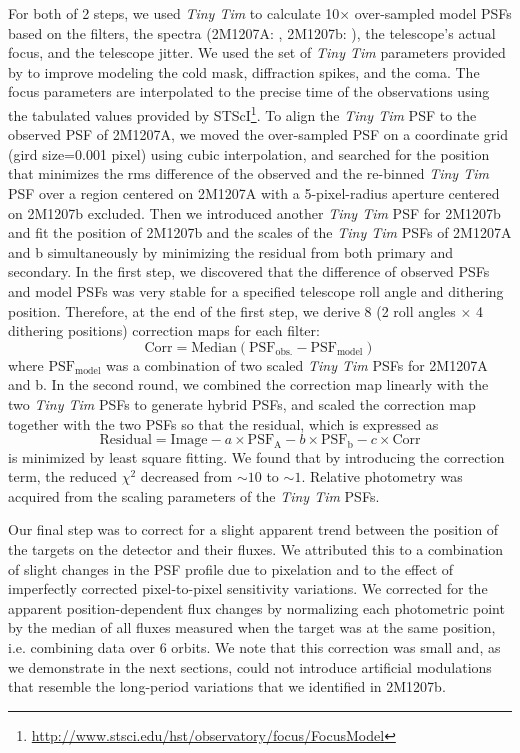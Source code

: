\documentclass[apj]{emulateapj}
\newcommand{\tinytim}{\textit{Tiny Tim}}
\begin{document}
For both of 2 steps, we used \tinytim{} to calculate 10$\times$
over-sampled model PSFs based on the filters, the spectra (2M1207A:
\cite{Bonnefoy2014}, 2M1207b: \cite{Patience2010}), the telescope's
actual focus, and the telescope jitter.  We used the set of \tinytim{}
parameters provided by \cite{Biretta2014} to improve modeling the cold
mask, diffraction spikes, and the coma. The focus parameters are 
interpolated to the precise time of the observations using the
tabulated values provided by
STScI\footnote{\url{http://www.stsci.edu/hst/observatory/focus/FocusModel}}.
To align the \tinytim{} PSF to the observed PSF of 2M1207A, we
moved the over-sampled PSF on a coordinate grid (gird size=0.001 pixel)
using cubic interpolation, and searched for the position that minimizes
the rms difference of the observed and the re-binned \tinytim{} PSF over
a region centered on 2M1207A with a 5-pixel-radius aperture centered
on 2M1207b excluded.  Then we introduced another \tinytim{} PSF for
2M1207b and fit the position of 2M1207b and the scales of the
\tinytim{} PSFs of 2M1207A and b simultaneously by minimizing the
residual from both primary and secondary. In the first step, we discovered that the
difference of observed PSFs and model PSFs was very stable for a
specified telescope roll angle and dithering position. Therefore, at the end of the first step,
we derive 8 (2 roll angles $\times$ 4 dithering positions) correction
maps for each filter:
\begin{equation}
  \mathrm{Corr = Median(PSF_{obs.} - PSF_{model} )}
\end{equation}
where $\mathrm{PSF_{model}}$ was a combination of two scaled \tinytim{} PSFs
for 2M1207A and b. In the second round, we combined the correction
map linearly with the two \tinytim{} PSFs to generate hybrid PSFs,
and scaled the correction map together with the two PSFs so that the
residual, which is expressed as
\begin{equation}
  \mathrm{Residual} = \mathrm{Image} - a\times \mathrm{PSF_{A}} - b\times
    \mathrm{PSF_{b}}- c\times\mathrm{ Corr}
  \end{equation}
  is minimized by least square fitting.
We found that by introducing the correction term,
the reduced $\chi^{2}$ decreased from $\sim 10$ to
$\sim 1$. Relative photometry was acquired from the scaling
parameters of the \tinytim{} PSFs.


Our final step was to correct for a slight apparent trend between the
position of the targets on the detector and their fluxes. We attributed
this to a combination of slight changes in the PSF profile due to
pixelation and to the effect of imperfectly corrected pixel-to-pixel
sensitivity variations. We corrected for the apparent
position-dependent flux changes by normalizing each photometric point
by the median of all fluxes measured when the target was at the
same position, i.e. combining data over 6 orbits.  We note that this
correction was small and, as we demonstrate in the next sections,
could not introduce artificial modulations that resemble the long-period
variations that we identified in 2M1207b. 
\end{document}

